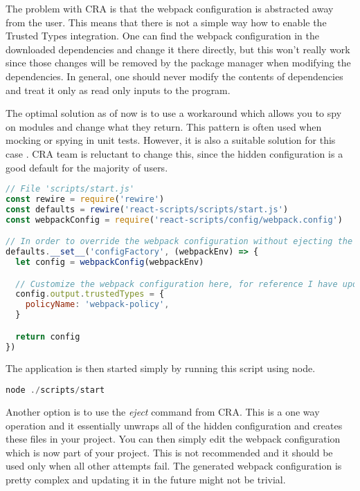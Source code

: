 The problem with CRA is that the webpack configuration is abstracted away from the user. This means
that there is not a simple way how to enable the Trusted Types integration. One can find the webpack
configuration in the downloaded dependencies and change it there directly, but this won't really
work since those changes will be removed by the package manager when modifying the dependencies. In
general, one should never modify the contents of dependencies and treat it only as read only inputs
to the program.

The optimal solution as of now is to use a workaround which allows you to spy on modules and change
what they return. This pattern is often used when mocking or spying in unit tests. However, it is
also a suitable solution for this case \cite{cra_modify_webpack_config}. CRA team is reluctant to
change this, since the hidden configuration is a good default for the majority of users.

\bigskip
\begin{lstlisting}[language=JavaScript, caption=Script to start React application with Trusted Types enabled in webpack]
// File 'scripts/start.js'
const rewire = require('rewire')
const defaults = rewire('react-scripts/scripts/start.js')
const webpackConfig = require('react-scripts/config/webpack.config')

// In order to override the webpack configuration without ejecting the create-react-app
defaults.__set__('configFactory', (webpackEnv) => {
  let config = webpackConfig(webpackEnv)

  // Customize the webpack configuration here, for reference I have updated webpack externals field
  config.output.trustedTypes = {
    policyName: 'webpack-policy',
  }

  return config
})
\end{lstlisting}

The application is then started simply by running this script using node.

\bigskip
\begin{lstlisting}[language=JavaScript, caption=Running the application]
node ./scripts/start
\end{lstlisting}

Another option is to use the \textit{eject} command from CRA. This is a one way operation and it
essentially unwraps all of the hidden configuration and creates these files in your project. You can
then simply edit the webpack configuration which is now part of your project. This is not
recommended and it should be used only when all other attempts fail. The generated webpack
configuration is pretty complex and updating it in the future might not be trivial.

